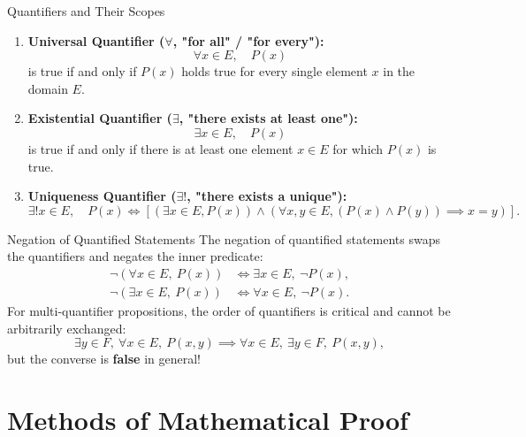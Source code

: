 \begin{definitionbox}{Quantifiers and Their Scopes}
\begin{enumerate}[leftmargin=1.4em,itemsep=3pt]
  \item \textbf{Universal Quantifier ($\forall$, "for all" / "for every"):}
  \[
  \forall x \in E, \quad P(x)
  \]
  is true if and only if $P(x)$ holds true for every single element $x$ in the domain $E$.
  \item \textbf{Existential Quantifier ($\exists$, "there exists at least one"):}
  \[
  \exists x \in E, \quad P(x)
  \]
  is true if and only if there is at least one element $x \in E$ for which $P(x)$ is true.
  \item \textbf{Uniqueness Quantifier ($\exists!$, "there exists a unique"):}
  \[
  \exists! x \in E, \quad P(x) \iff \left[ (\exists x \in E, P(x)) \land (\forall x, y \in E, (P(x) \land P(y)) \implies x = y) \right].
  \]
\end{enumerate}
\end{definitionbox}

\begin{theorembox}{Negation of Quantified Statements}
The negation of quantified statements swaps the quantifiers and negates the inner predicate:
\begin{align}
\neg \left( \forall x \in E, \ P(x) \right) &\iff \exists x \in E, \ \neg P(x), \\
\neg \left( \exists x \in E, \ P(x) \right) &\iff \forall x \in E, \ \neg P(x).
\end{align}
For multi-quantifier propositions, the order of quantifiers is critical and cannot be arbitrarily exchanged:
\[
\exists y \in F, \ \forall x \in E, \ P(x, y) \implies \forall x \in E, \ \exists y \in F, \ P(x, y),
\]
but the converse is \textbf{false} in general!
\end{theorembox}

\section{Methods of Mathematical Proof}

